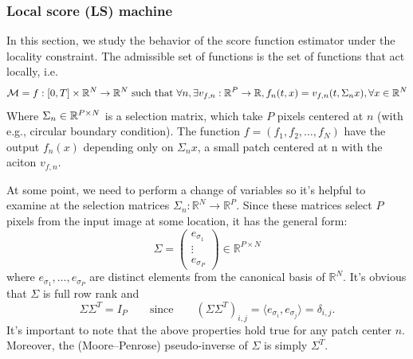\documentclass[a4paper,10pt]{article}
\begin{document}
\subsubsection{Local score (LS) machine}
In this section, we study the behavior of the score function estimator under the locality constraint.
The admissible set of functions is the set of functions that act locally, i.e. 
\begin{equation*}
    \mathcal{M} = {f:[0,T]\times\mathbb{R}^N \rightarrow \mathbb{R}^N \text{ such that } \forall n, \exists v_{f,n} : \mathbb{R}^P \rightarrow \mathbb{R}, f_n(t,x)=v_{f,n}(t,\Sigma_n x), \forall x\in \mathbb{R}^N}
\end{equation*}
Where $\Sigma_n \in \mathbb{R}^{P\times N}$ is a selection matrix, which take $P$ pixels centered at $n$ (with e.g., circular boundary condition). The function $f = (f_1,f_2,\dots,f_N)$ have the output $f_n(x)$ depending only on $\Sigma_n x$, a small patch centered at n with the aciton $v_{f,n}$.

At some point, we need to perform a change of variables so it's helpful to examine at the selection matrices 
$\Sigma_n : \mathbb{R}^N \rightarrow \mathbb{R}^P$. 
Since these matrices select $P$ pixels from the input image at some location, it has the general form:
\[
\Sigma = 
\begin{pmatrix}
e_{\sigma_1} \\
\vdots \\
e_{\sigma_P}
\end{pmatrix}
\in \mathbb{R}^{P \times N}
\]
where $e_{\sigma_1}, \ldots, e_{\sigma_P}$ are distinct elements from the canonical basis of $\mathbb{R}^N$. 
It's obvious that $\Sigma$ is full row rank and
\[
\Sigma \Sigma^T = I_P \qquad \text{since} \qquad (\Sigma \Sigma^T)_{i,j} = \langle e_{\sigma_i}, e_{\sigma_j} \rangle = \delta_{i,j}.
\]
It's important to note that the above properties hold true for any patch center $n$. 
Moreover, the (Moore–Penrose) pseudo-inverse of $\Sigma$ is simply $\Sigma^T$.
\end{document}
